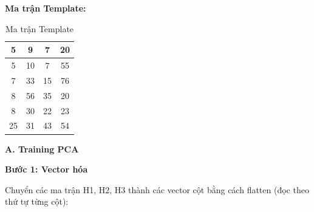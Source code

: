 \textbf{Ma trận Template:}
\begin{table}[H]
\centering
\begin{tabular}{|c|c|c|c|}
\hline
5 & 9 & 7 & 20 \\
\hline
5 & 10 & 7 & 55 \\
\hline
7 & 33 & 15 & 76 \\
\hline
8 & 56 & 35 & 20 \\
\hline
8 & 30 & 22 & 23 \\
\hline
25 & 31 & 43 & 54 \\
\hline
\end{tabular}
\caption{Ma trận Template}
\end{table}

\textbf{A. Training PCA}

\textbf{Bước 1: Vector hóa}

Chuyển các ma trận H1, H2, H3 thành các vector cột bằng cách flatten (đọc theo thứ tự từng cột):

